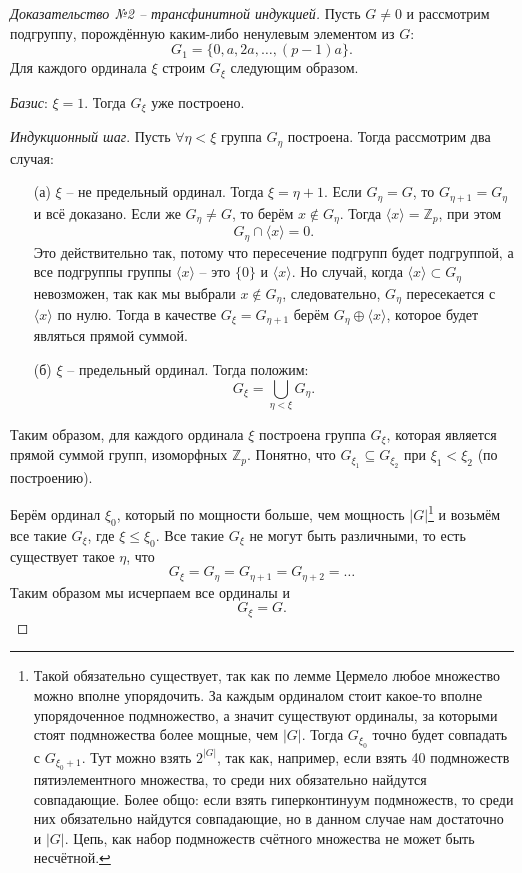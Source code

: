 \documentclass{article}
\begin{document}
\begin{proof}[Доказательство №2 -- трансфинитной индукцией]
    Пусть $G \neq 0$ и рассмотрим подгруппу, порождённую каким-либо ненулевым элементом из $G$: $$ G_1 = \{ 0, a, 2a, \ldots, (p-1)a \}. $$
    Для каждого ординала $\xi$ строим $G_\xi$ следующим образом.

    \textit{Базис}: $\xi = 1$. Тогда $G_\xi$ уже построено.

    \textit{Индукционный шаг}. Пусть $\forall \eta < \xi$ группа $G_\eta$ построена. Тогда рассмотрим два случая:
    \begin{enumerate}
        \item[(а)] $\xi$ -- не предельный ординал. Тогда $\xi = \eta + 1$. Если $G_\eta  = G$, то $G_{\eta + 1} = G_\eta$ и всё доказано. Если же $G_\eta \neq G$, то берём $x \notin G_\eta$. Тогда $\langle x \rangle = \mathbb{Z}_p$, при этом $$ G_\eta \cap \langle x \rangle = 0. $$ Это действительно так, потому что пересечение подгрупп будет подгруппой, а все подгруппы группы $\langle x \rangle$ -- это $\{ 0 \}$ и $\langle x \rangle$. Но случай, когда $\langle x \rangle \subset G_\eta$ невозможен, так как мы выбрали $x \notin G_\eta$, следовательно, $G_\eta$ пересекается с $\langle x \rangle$ по нулю.
        Тогда в качестве $G_\xi = G_{\eta + 1}$ берём $G_\eta \oplus \langle x \rangle$, которое будет являться прямой суммой.

        \item[(б)] $\xi$ -- предельный ординал. Тогда положим: $$ G_\xi = \bigcup_{\eta < \xi}  G_\eta. $$
    \end{enumerate}

    Таким образом, для каждого ординала $\xi$ построена группа $G_\xi$, которая является прямой суммой групп, изоморфных $\mathbb{Z}_p$.
    Понятно, что $G_{\xi_1} \subseteq G_{\xi_2}$ при $\xi_1 < \xi_2$ (по построению).

    Берём ординал $\xi_0$, который по мощности больше, чем мощность $|G|$\footnote{Такой обязательно существует, так как по лемме Цермело любое множество можно вполне упорядочить. За каждым ординалом стоит какое-то вполне упорядоченное подмножество, а значит существуют ординалы, за которыми стоят подмножества более мощные, чем $|G|$. Тогда $G_{\xi_0}$ точно будет совпадать с $G_{\xi_0 + 1}$. Тут можно взять $2^{|G|}$, так как, например, если взять 40 подмножеств пятиэлементного множества, то среди них обязательно найдутся совпадающие. Более общо: если взять гиперконтинуум подмножеств, то среди них обязательно найдутся совпадающие, но в данном случае нам достаточно и $|G|$. Цепь, как набор подмножеств счётного множества не может быть несчётной.} и возьмём все такие $G_\xi$, где $\xi \leqslant \xi_0$. Все такие $G_\xi$ не могут быть различными, то есть существует такое $\eta$, что $$ G_\xi = G_\eta = G_{\eta + 1} = G_{\eta + 2} = \ldots $$ Таким образом мы исчерпаем все ординалы и $$ G_\xi = G. $$
\end{proof}
\end{document}
